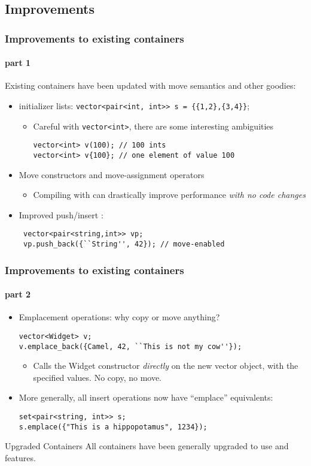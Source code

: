 \subsection{Improvements}
\begin{frame}[fragile]
\frametitle{Improvements to existing containers}
\framesubtitle{part 1}
Existing containers have been updated with move semantics and other goodies:
\begin{itemize}
\item initializer lists: \texttt{vector<pair<int, int>> s =
  \{\{1,2\},\{3,4\}\}};
  \begin{itemize}
  \item Careful with \texttt{vector<int>}, there are some interesting ambiguities
    \begin{verbatim}
vector<int> v(100); // 100 ints
vector<int> v{100}; // one element of value 100
    \end{verbatim}
   \end{itemize}
\item Move constructors and move-assignment operators
  \begin{itemize}
    \item Compiling with  can drastically improve performance
      \emph{with no code changes}
  \end{itemize}
\item Improved push/insert :
  \begin{verbatim}
 vector<pair<string,int>> vp;
 vp.push_back({``String'', 42}); // move-enabled
\end{verbatim}
\end{itemize}
\end{frame}

\begin{frame}[fragile]
\frametitle{Improvements to existing containers}
\framesubtitle{part 2}
\begin{itemize}
\item Emplacement operations: why copy or move anything?
\begin{verbatim}
vector<Widget> v;
v.emplace_back({Camel, 42, ``This is not my cow''});
\end{verbatim}
  \begin{itemize}
    \item Calls the Widget constructor \emph{directly} on the new
      vector object, with the specified values.  No copy, no move.
  \end{itemize}
\item More generally, all insert operations now have ``emplace''
  equivalents:
\begin{verbatim}
set<pair<string, int>> s;
s.emplace({"This is a hippopotamus", 1234});
\end{verbatim}
\end{itemize}

\begin{block}{Upgraded Containers}
All containers have been generally upgraded to use  and 
features.
\end{block}

\end{frame}
